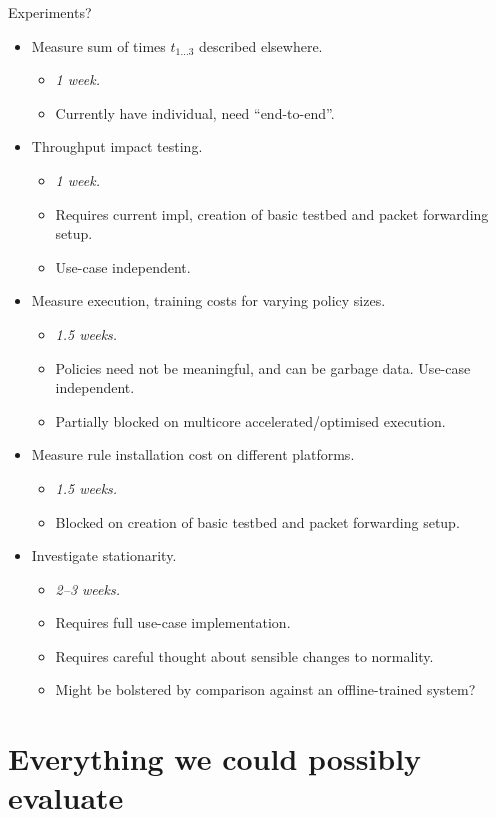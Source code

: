 \documentclass[sigconf,natbib=false]{acmart}
\begin{document}
Experiments?
\begin{itemize}
	\item Measure sum of times $t_{1...3}$ described elsewhere.
	\begin{itemize}
		\item \emph{\num{1} week.}
		\item Currently have individual, need ``end-to-end''.
	\end{itemize}
	\item Throughput impact testing.
	\begin{itemize}
		\item \emph{\num{1} week.}
		\item Requires current impl, creation of basic testbed and packet forwarding setup.
		\item Use-case independent.
	\end{itemize}
	\item Measure execution, training costs for varying policy sizes.
	\begin{itemize}
		\item \emph{\num{1.5} weeks.}
		\item Policies need not be meaningful, and can be garbage data. Use-case independent.
		\item Partially blocked on multicore accelerated/optimised execution.
	\end{itemize}
	\item Measure rule installation cost on different platforms.
	\begin{itemize}
		\item \emph{\num{1.5} weeks.}
		\item Blocked on creation of basic testbed and packet forwarding setup.
	\end{itemize}
	\item Investigate stationarity.
	\begin{itemize}
		\item \emph{\numrange{2}{3} weeks.}
		\item Requires full use-case implementation.
		\item Requires careful thought about sensible changes to normality.
		\item Might be bolstered by comparison against an offline-trained system?
	\end{itemize}
\end{itemize}

\section{Everything we could possibly evaluate}
\end{document}
